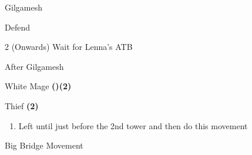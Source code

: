 \begin{paracol}{2}
\begin{boss}{Gilgamesh}
	\varwb
	\begin{round}{1}
        \faris Defend
        \lenna \leftCommand{\gilToss}
        \bartz \leftCommand{\gilToss}
        \galuf \leftCommand{\gilToss}
    \end{round}
    \begin{round}{2 (Onwards)}
        \faris Wait for Lenna's ATB \then \leftCommand{\gilToss}
        \item {}
        \item {}
        \vspace{1mm}
        \item[] 
        \lenna \leftCommand{\gilToss} 
        \anyone \leftCommand{\gilToss}
        \anyone \leftCommand{\gilToss}
    \end{round}
	\varwe
\end{boss}

\switchcolumnTwice[*]
\begin{menu}{After Gilgamesh}
    \varwb
    \begin{jobMenu}
        \bartz White Mage \textbf{(\pointDown)(2\pointRight)}
    \end{jobMenu}
    \begin{magicMenu}
        \bartz \life \space \then {}
        \bartz \cure \space \then {}
    \end{magicMenu}
    \begin{jobMenu}
        \bartz Thief \textbf{(2\pointRight)} \ability{!\escape}
    \end{jobMenu}
    \varwe
\end{menu}

\begin{enumerate}[resume]
    \item Left until just before the 2nd tower and then do this movement
\end{enumerate}

\switchcolumn
\begin{misc}{Big Bridge Movement}
\end{misc}

\end{paracol}